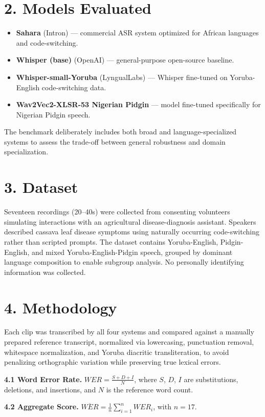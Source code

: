 \documentclass[9pt,twocolumn]{article}
\begin{document}
\section*{2. Models Evaluated}
\begin{itemize}\itemsep0pt
    \item \textbf{Sahara} (Intron) --- commercial ASR system optimized for African languages and code-switching.
    \item \textbf{Whisper (base)} (OpenAI) --- general-purpose open-source baseline.
    \item \textbf{Whisper-small-Yoruba} (LyngualLabs) --- Whisper fine-tuned on Yoruba-English code-switching data.
    \item \textbf{Wav2Vec2-XLSR-53 Nigerian Pidgin} --- model fine-tuned specifically for Nigerian Pidgin speech.
\end{itemize}
The benchmark deliberately includes both broad and language-specialized systems to assess the trade-off between general robustness and domain specialization.

\section*{3. Dataset}
Seventeen recordings (\raisebox{0.5ex}{\texttildelow}20--40s) were collected from consenting volunteers simulating interactions with an agricultural disease-diagnosis assistant. Speakers described cassava leaf disease symptoms using naturally occurring code-switching rather than scripted prompts. The dataset contains Yoruba-English, Pidgin-English, and mixed Yoruba-English-Pidgin speech, grouped by dominant language composition to enable subgroup analysis. No personally identifying information was collected.

\section*{4. Methodology}
Each clip was transcribed by all four systems and compared against a manually prepared reference transcript, normalized via lowercasing, punctuation removal, whitespace normalization, and Yoruba diacritic transliteration, to avoid penalizing orthographic variation while preserving true lexical errors.

\textbf{4.1 Word Error Rate.} $WER = \frac{S+D+I}{N}$, where $S$, $D$, $I$ are substitutions, deletions, and insertions, and $N$ is the reference word count.

\textbf{4.2 Aggregate Score.} $\overline{WER} = \frac{1}{n}\sum_{i=1}^{n} WER_i$, with $n=17$.
\end{document}
